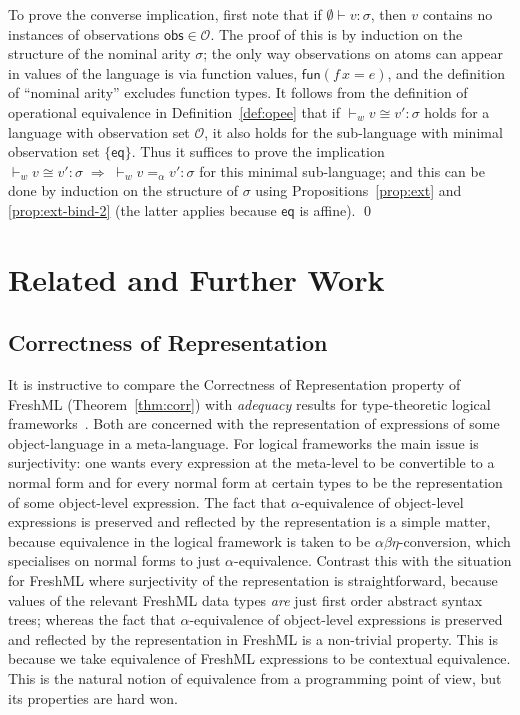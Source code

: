 \documentclass{LMCS}
\theoremstyle{plain}
\theoremstyle{definition}
\newcommand{\aeq}{=_{\alpha}}
\newcommand{\ar}[1][\sigma]{#1}
\newcommand{\ent}{\vdash}
\newcommand{\EQ}{\mathbin{\kw{=}}}
\renewcommand{\exp}[1][e]{#1}
\newcommand{\FUN}{\kw{fun}}
\newcommand{\imp}{\Rightarrow}
\newcommand{\kw}[1]{\mathsf{#1}}
\newcommand{\Obs}{\mathcal{O}}
\newcommand{\OBS}[1][obs]{\kw{#1}}
\newcommand{\ofty}{:}
\newcommand{\opeq}{\cong}
\newcommand{\val}[1][v]{#1}
\newcommand{\vid}[1][x]{#1}
\newcommand{\w}[1][w]{#1}
\begin{document}
  To prove the converse implication, first note that if $\emptyset\ent
  \val\ofty\ar$, then $\val$ contains no instances of observations
  $\OBS\in\Obs$. The proof of this is by induction on the structure of
  the nominal arity $\ar$; the only way observations on atoms can
  appear in values of the language is via function values,
  $\FUN(\vid[f]\,\vid\EQ\exp)$, and the definition of ``nominal
  arity'' excludes function types. It follows from the definition of
  operational equivalence in Definition~\ref{def:opee} that if
  ${}\ent_{\w} \val \opeq\val'\ofty\ar$ holds for a language with
  observation set $\Obs$, it also holds for the sub-language with
  minimal observation set $\{\OBS[eq]\}$. Thus it suffices to prove
  the implication ${}\ent_{\w} \val \opeq\val'\ofty\ar \;\imp\;
  {}\ent_{\w} \val\aeq\val'\ofty \ar$ for this minimal sub-language;
  and this can be done by induction on the structure of $\ar$ using
  Propositions~\ref{prop:ext} and \ref{prop:ext-bind-2} (the latter
  applies because $\OBS[eq]$ is affine).
\qed

\section{Related and Further Work}
\label{sec:related-work}


\subsection{Correctness of Representation}

It is instructive to compare the Correctness of Representation
property of FreshML (Theorem~\ref{thm:corr}) with \emph{adequacy}
results for type-theoretic logical frameworks~\cite{PfenningF:logf}.
Both are concerned with the representation of expressions of some
object-language in a meta-language. For logical frameworks the main
issue is surjectivity: one wants every expression at the meta-level to
be convertible to a normal form and for every normal form at certain
types to be the representation of some object-level expression. The
fact that $\alpha$-equivalence of object-level expressions is
preserved and reflected by the representation is a simple matter,
because equivalence in the logical framework is taken to be
$\alpha\beta\eta$-conversion, which specialises on normal forms to
just $\alpha$-equivalence. Contrast this with the situation for
FreshML where surjectivity of the representation is straightforward,
because values of the relevant FreshML data types \emph{are} just
first order abstract syntax trees; whereas the fact that
$\alpha$-equivalence of object-level expressions is preserved and
reflected by the representation in FreshML is a non-trivial property.
This is because we take equivalence of FreshML expressions to be
contextual equivalence. This is the natural notion of equivalence from
a programming point of view, but its properties are hard won.
\end{document}
